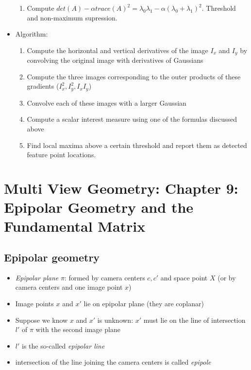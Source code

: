 \documentclass[a4paper]{article}
\begin{document}
\begin{itemize}
\begin{enumerate}
            \item
                Compute $det(A) - \alpha trace(A)^2 = \lambda_0 \lambda_1 - \alpha (\lambda_0 + \lambda_1)^2$. Threshold and non-maximum supression.
        \end{enumerate}
    \item
        Algorithm:
        \begin{enumerate}
            \item
                Compute the horizontal and vertical derivatives of the image $I_x$ and $I_y$ by convolving the original image with derivatives of Gaussians
            \item
                Compute the three images corresponding to the outer products of these gradients ($I_x^2, I_y^2, I_x I_y$)
            \item
                Convolve each of these images with a larger Gaussian
            \item
                Compute a scalar interest measure using one of the formulas discussed above
            \item
                Find local maxima above a certain threshold and report them as detected feature point locations.
                
        \end{enumerate}

\end{itemize}


\section*{Multi View Geometry: Chapter 9: Epipolar Geometry and the Fundamental Matrix}
\subsection*{Epipolar geometry}
\begin{itemize}
    \item
        \textit{Epipolar plane} $\pi$: formed by camera centers $c, c'$ and space point $X$ (or by camera centers and one image point $x$)
    \item
        Image points $x$ and $x'$ lie on epipolar plane (they are coplanar)
    \item
        Suppose we know $x$ and $x'$ is unknown: $x'$ must lie on the line of intersection $l'$ of $\pi$ with the second image plane
    \item
        $l'$ is the so-called \textit{epipolar line}
    \item
        intersection of the line joining the camera centers is called \textit{epipole}
\end{itemize}
\end{document}

